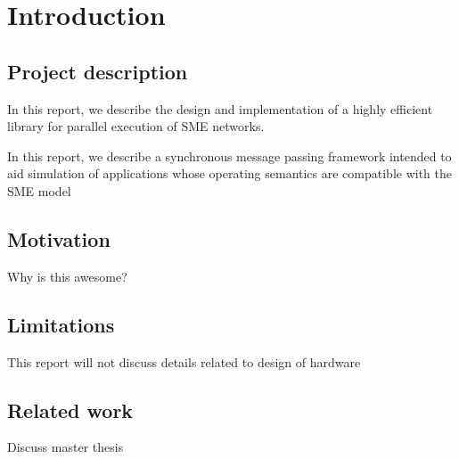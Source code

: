 \chapter{Introduction}

\section{Project description}
In this report, we describe the design and implementation of a highly
efficient library for parallel execution of SME networks.

In this report, we describe a synchronous message passing framework
intended to aid simulation of applications whose operating semantics
are compatible with the SME model

\section{Motivation}
Why is this awesome?

\section{Limitations}
This report will not discuss details related to design of hardware

\section{Related work}
Discuss master thesis

